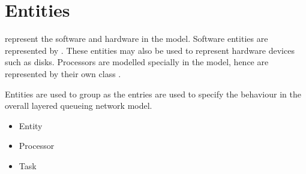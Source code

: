 % 
% 
\chapter{Entities}
\label{sec:entities}

 represent the software and hardware  in the
model.  Software entities are represented by
.  These entities may also be used to
represent hardware devices such as disks.  Processors are modelled
specially in the model, hence are represented by their own class
.

\begin{figure}[htbp]
  \label{fig:entity}
  \begin{center}
  \end{center}
\end{figure}

Entities are used to group  as the
entries are used to specify the behaviour in the overall layered
queueing network model.

\begin{iftex}
\begin{itemize}
\item Entity
\item Processor
\item Task
\end{itemize}
\end{iftex}




